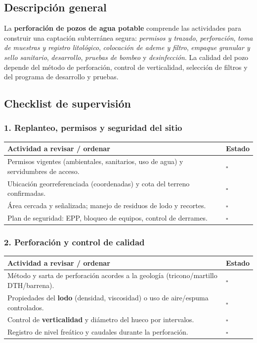 \documentclass[12pt]{article}
\newcommand{\cbox}{\(\square\)} %
\begin{document}
	\subsection*{Descripción general}
	La \textbf{perforación de pozos de agua potable} comprende las actividades para construir una captación subterránea segura: \emph{permisos y trazado}, \emph{perforación}, \emph{toma de muestras y registro litológico}, \emph{colocación de ademe y filtro}, \emph{empaque granular y sello sanitario}, \emph{desarrollo}, \emph{pruebas de bombeo} y \emph{desinfección}. La calidad del pozo depende del método de perforación, control de verticalidad, selección de filtros y del programa de desarrollo y pruebas.
	

	\subsection{Checklist de supervisión}
	
	\subsubsection*{1. Replanteo, permisos y seguridad del sitio}
	\begin{tabularx}{\linewidth}{>{\raggedright\arraybackslash}p{0.93\linewidth} >{\centering\arraybackslash}m{0.07\linewidth}}
		\toprule
		\textbf{Actividad a revisar / ordenar} & \textbf{Estado}\\
		\midrule
		Permisos vigentes (ambientales, sanitarios, uso de agua) y servidumbres de acceso. & \cbox \\
		Ubicación georreferenciada (coordenadas) y cota del terreno confirmadas. & \cbox \\
		Área cercada y señalizada; manejo de residuos de lodo y recortes. & \cbox \\
		Plan de seguridad: EPP, bloqueo de equipos, control de derrames. & \cbox \\
		\bottomrule
	\end{tabularx}
	
	\subsubsection*{2. Perforación y control de calidad}
	\begin{tabularx}{\linewidth}{>{\raggedright\arraybackslash}p{0.93\linewidth} >{\centering\arraybackslash}m{0.07\linewidth}}
		\toprule
		\textbf{Actividad a revisar / ordenar} & \textbf{Estado}\\
		\midrule
		Método y sarta de perforación acordes a la geología (tricono/martillo DTH/barrena). & \cbox \\
		Propiedades del \textbf{lodo} (densidad, viscosidad) o uso de aire/espuma controlados. & \cbox \\
		Control de \textbf{verticalidad} y diámetro del hueco por intervalos. & \cbox \\
		Registro de nivel freático y caudales durante la perforación. & \cbox \\
		\bottomrule
	\end{tabularx}
	
\end{document}

